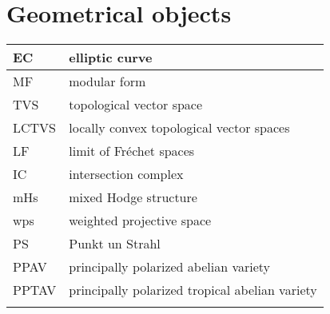 \documentclass{amsart}
\numberwithin{equation}{section}
\theoremstyle{plain}
\numberwithin{equation}{section}
\theoremstyle{remark}
\begin{document}
\section{Geometrical objects}
\begin{longtable}{l|l}
\hline
EC & elliptic curve \\ \hline
MF & modular form  \\ \hline
TVS & topological vector space\\ \hline
LCTVS &  locally convex topological vector spaces\\ \hline
LF & limit of Fréchet spaces\\ \hline
IC & intersection complex\\ \hline
mHs & mixed Hodge structure\\ \hline
wps & weighted projective space\\ \hline
PS & Punkt un Strahl\\ \hline
PPAV & principally polarized abelian variety\\ \hline
PPTAV & principally polarized tropical abelian variety\\ \hline
 & \\ \hline
\end{longtable}
\end{document}
